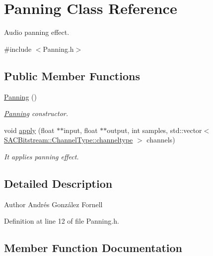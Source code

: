 \hypertarget{class_panning}{}\section{Panning Class Reference}
\label{class_panning}


Audio panning effect.  




{\ttfamily \#include $<$Panning.\+h$>$}

\subsection*{Public Member Functions}
\begin{DoxyCompactItemize}
\item 
\mbox{\label{class_panning_a34a63be4543f6d7bafaeaa14421c7719}} 
\hyperlink{class_panning_a34a63be4543f6d7bafaeaa14421c7719}{Panning} ()
\begin{DoxyCompactList}\small\item\em \hyperlink{class_panning}{Panning} constructor. \end{DoxyCompactList}\item 
void \hyperlink{class_panning_a24d4cc11b0ee5c3838fcd042302ea90e}{apply} (float $\ast$$\ast$input, float $\ast$$\ast$output, int samples, std\+::vector$<$ \hyperlink{struct_s_a_c_bitstream_1_1_channel_type_a31c32b34085c06a1c58d920ca28c17c9}{S\+A\+C\+Bitstream\+::\+Channel\+Type\+::channeltype} $>$ channels)
\begin{DoxyCompactList}\small\item\em It applies panning effect. \end{DoxyCompactList}\end{DoxyCompactItemize}


\subsection{Detailed Description}
\begin{DoxyAuthor}{Author}
Andrés González Fornell 
\end{DoxyAuthor}


Definition at line 12 of file Panning.\+h.



\subsection{Member Function Documentation}
\mbox{\label{class_panning_a24d4cc11b0ee5c3838fcd042302ea90e}} 
